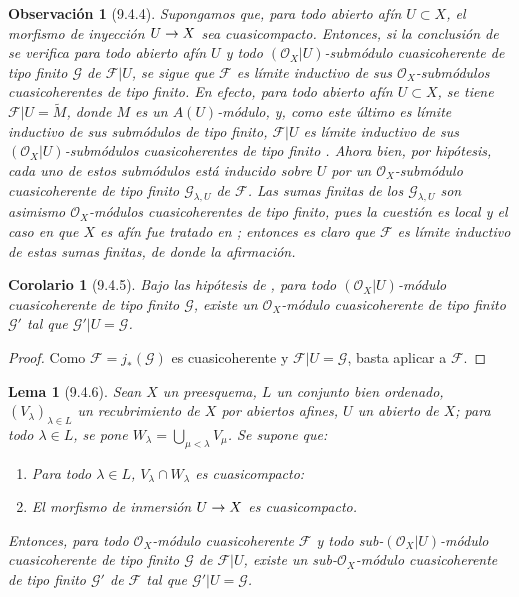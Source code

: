 \documentclass[oneside]{amsart}
\theoremstyle{ega-env-style}
\theoremstyle{ega-thm-env-style}
\newtheorem*{lemma}{Lema}
\newtheorem*{corollary}{Corolario}
\theoremstyle{ega-defn-env-style}
\newtheorem*{remark}{Observación}
\renewcommand{\to}{\mathchoice{\longrightarrow}{\rightarrow}{\rightarrow}{\rightarrow}}
\newcommand{\oldpage}[2][]{{\marginnote{\normalfont{\textbf{#1}~|~#2}}}\ignorespaces}
\let\EGAOriginalLabel\label
\renewcommand{\label}[1]{\phantomsection\EGAOriginalLabel{#1}}
\begin{document}
\begin{remark}[9.4.4]
\label{I.9.4.4}
Supongamos que, para \emph{todo} abierto afín $U\subset X$, el morfismo de inyección
$U\to X$ sea cuasicompacto. Entonces, si la conclusión de  se verifica
para todo abierto afín $U$ y todo $(\mathscr{O}_X|U)$-submódulo cuasicoherente de tipo finito
$\mathscr{G}$ de $\mathscr{F}|U$,
\oldpage[I]{175}
se sigue que $\mathscr{F}$ es límite inductivo de sus $\mathscr{O}_X$-submódulos cuasicoherentes
de tipo finito. En efecto, para todo abierto afín $U\subset X$, se tiene
$\mathscr{F}|U=\widetilde{M}$, donde $M$ es un $A(U)$-módulo, y, como este último es límite
inductivo de sus submódulos de tipo finito, $\mathscr{F}|U$ es límite inductivo de sus
$(\mathscr{O}_X|U)$-submódulos cuasicoherentes de tipo finito . Ahora bien,
por hipótesis, cada uno de estos submódulos está inducido sobre $U$ por un
$\mathscr{O}_X$-submódulo cuasicoherente de tipo finito $\mathscr{G}_{\lambda,U}$ de $\mathscr{F}$.
Las sumas finitas de los $\mathscr{G}_{\lambda,U}$ son asimismo $\mathscr{O}_X$-módulos
cuasicoherentes de tipo finito, pues la cuestión es local y el caso en que $X$ es afín
fue tratado en ; entonces es claro que $\mathscr{F}$ es límite inductivo de
estas sumas finitas, de donde la afirmación.
\end{remark}

\begin{corollary}[9.4.5]
\label{I.9.4.5}
Bajo las hipótesis de , para todo $(\mathscr{O}_X|U)$-módulo cuasicoherente
de tipo finito $\mathscr{G}$, existe un $\mathscr{O}_X$-módulo cuasicoherente de tipo finito
$\mathscr{G}'$ tal que $\mathscr{G}'|U=\mathscr{G}$.
\end{corollary}

\begin{proof}
Como $\mathscr{F}=j_*(\mathscr{G})$ es cuasicoherente  y
$\mathscr{F}|U=\mathscr{G}$, basta aplicar  a $\mathscr{F}$.
\end{proof}

\begin{lemma}[9.4.6]
\label{I.9.4.6-fr}
Sean $X$ un preesquema, $L$ un conjunto bien ordenado,
$(V_\lambda)_{\lambda\in L}$ un recubrimiento de $X$ por abiertos afines,
$U$ un abierto de $X$; para todo $\lambda\in L$, se pone
$W_\lambda=\bigcup_{\mu<\lambda}V_\mu$. Se supone que:
\begin{enumerate}
  \item[\textup{1\textsuperscript{o}}] Para todo $\lambda\in L$,
    $V_\lambda\cap W_\lambda$ es cuasicompacto:
  \item[\textup{2\textsuperscript{o}}] El morfismo de inmersión $U\to X$ es
    cuasicompacto.
\end{enumerate}
Entonces, para todo $\mathscr{O}_X$-módulo cuasicoherente $\mathscr{F}$ y todo
sub-$(\mathscr{O}_X|U)$-módulo cuasicoherente \textup{de tipo finito} $\mathscr{G}$ de
$\mathscr{F}|U$, existe un sub-$\mathscr{O}_X$-módulo cuasicoherente \textup{de
tipo finito} $\mathscr{G}'$ de $\mathscr{F}$ tal que
$\mathscr{G}'|U=\mathscr{G}$.
\end{lemma}
\end{document}
